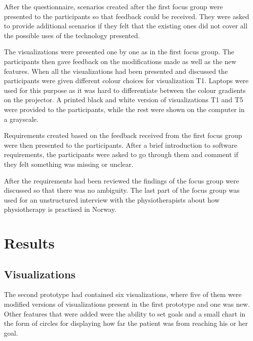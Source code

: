 After the questionnaire, scenarios created after the first focus group were presented to the participants so that feedback could be received. They were asked to provide additional scenarios if they felt that the existing ones did not cover all the possible uses of the technology presented.

The visualizations were presented one by one as in the first focus group. The participants then gave feedback on the modifications made as well as the new features. When all the visualizations had been presented and discussed the participants were given different colour choices for visualization T1. Laptops were used for this purpose as it was hard to differentiate between the colour gradients on the projector. A printed black and white version of visualizations T1 and T5 were provided to the participants, while the rest were shown on the computer in a grayscale.

Requirements created based on the feedback received from the first focus group were then presented to the participants. After a brief introduction to software requirements, the participants were asked to go through them and comment if they felt something was missing or unclear.

After the requirements had been reviewed the findings of the focus group were discussed so that there was no ambiguity. The last part of the focus group was used for an unstructured interview with the physiotherapists about how physiotherapy is practised in Norway. 

\section{Results}

\subsection{Visualizations}
The second prototype had contained six visualizations, where five of them were modified versions of visualizations present in the first prototype and one was new. Other features that were added were the ability to set goals and a small chart in the form of circles for displaying how far the patient was from reaching his or her goal.

